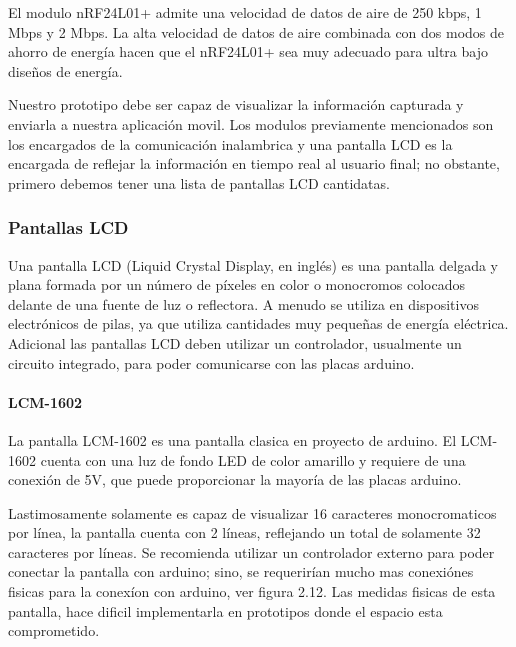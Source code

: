\par \noindent
El modulo nRF24L01+ admite una velocidad de datos de aire de 250 kbps, 1 Mbps y 2 Mbps.
La alta velocidad de datos de aire combinada con dos modos de ahorro de energía hacen que el nRF24L01+ sea muy adecuado para ultra bajo
diseños de energía\cite{nrf}.

\par \noindent
Nuestro prototipo debe ser capaz de visualizar la información capturada y enviarla a nuestra aplicación movil. 
Los modulos previamente mencionados son los encargados de la comunicación inalambrica y una pantalla LCD es la encargada de reflejar la información en tiempo real al usuario final; no obstante, primero debemos tener una lista de pantallas LCD cantidatas.

\subsubsection{Pantallas LCD}

Una pantalla LCD (Liquid Crystal Display, en inglés) es una pantalla delgada y plana formada por un número de píxeles en color o monocromos colocados delante de una fuente de luz o reflectora. A menudo se utiliza en dispositivos electrónicos de pilas, ya que utiliza cantidades muy pequeñas de energía eléctrica\cite{lcd}. Adicional las pantallas LCD deben utilizar un controlador, usualmente un circuito integrado, para poder comunicarse con las placas arduino. 

\paragraph{LCM-1602}

La pantalla LCM-1602 es una pantalla clasica en proyecto de arduino. El LCM-1602 cuenta con una luz de fondo LED de color amarillo y requiere de una conexión de 5V, que puede proporcionar la mayoría de las placas arduino. 

\clearpage

Lastimosamente solamente es capaz de visualizar 16 caracteres monocromaticos por línea, la pantalla cuenta con 2 líneas, reflejando un total de solamente 32 caracteres por líneas\cite{lcm}. Se recomienda utilizar un controlador externo para poder conectar la pantalla con arduino; sino, se requerirían mucho mas conexiónes fisicas para la conexíon con arduino, ver figura 2.12. Las medidas fisicas de esta pantalla, hace dificil implementarla en prototipos donde el espacio esta comprometido.

